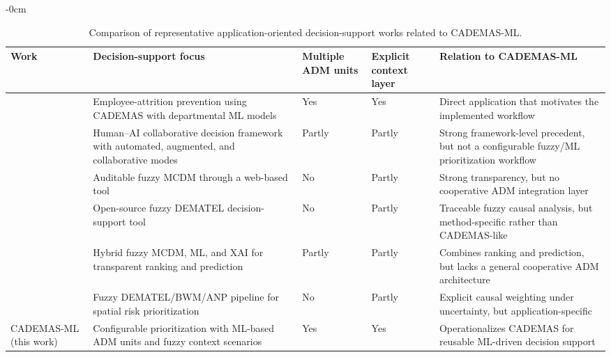 \documentclass[article,submit,pdftex,moreauthors,mathematics]{Definitions/mdpi}
\begin{document}

\begin{table}[t]
\caption{Comparison of representative application-oriented decision-support works related to CADEMAS-ML.\label{tab:related}}
\small
\begin{adjustwidth}{-\extralength}{0cm}
	\begin{tabularx}{\fulllength}{>{\raggedright\arraybackslash}p{2cm} >{\raggedright\arraybackslash}X p{2cm} p{2cm} >{\raggedright\arraybackslash}X}
		\toprule
		\textbf{Work} & \textbf{Decision-support focus} & \textbf{Multiple ADM units} & \textbf{Explicit context layer} & \textbf{Relation to CADEMAS-ML} \\
		\midrule
		\citet{Godz2026} & Employee-attrition prevention using CADEMAS with departmental ML models & Yes & Yes & Direct application that motivates the implemented workflow \\
		\citet{Tariq2024a} & Human--AI collaborative decision framework with automated, augmented, and collaborative modes & Partly & Partly & Strong framework-level precedent, but not a configurable fuzzy/ML prioritization workflow \\
		\citet{Wieckowski2024} & Auditable fuzzy MCDM through a web-based tool & No & Partly & Strong transparency, but no cooperative ADM integration layer \\
		\citet{Chekry2024} & Open-source fuzzy DEMATEL decision-support tool & No & Partly & Traceable fuzzy causal analysis, but method-specific rather than CADEMAS-like \\
		\citet{Ozkurt2025} & Hybrid fuzzy MCDM, ML, and XAI for transparent ranking and prediction & Partly & Partly & Combines ranking and prediction, but lacks a general cooperative ADM architecture \\
		\citet{Sahraei2022} & Fuzzy DEMATEL/BWM/ANP pipeline for spatial risk prioritization & No & Partly & Explicit causal weighting under uncertainty, but application-specific \\
		\midrule
		CADEMAS-ML (this work) & Configurable prioritization with ML-based ADM units and fuzzy context scenarios & Yes & Yes & Operationalizes CADEMAS for reusable ML-driven decision support \\
		\bottomrule
	\end{tabularx}
\end{adjustwidth}
\end{table}
\end{document}
